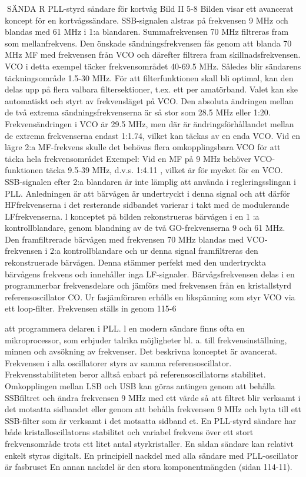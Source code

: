 SÄNDA R
PLL-styrd sändare för kortvåg
Bild II 5-8
Bilden visar ett avancerat koncept för en
kortvågssändare. SSB-signalen alstras på
frekvensen 9 MHz och blandas med 61 MHz
i 1:a blandaren.
Summafrekvensen 70 MHz filtreras fram
som mellanfrekvens. Den önskade sändningsfrekvensen fås genom att blanda 70
MHz MF med frekvensen från VCO och
därefter filtrera fram skillnadsfrekvensen.
VCO i detta exempel täcker frekvensområdet 40-69.5 MHz. Således blir sändarens
täckningsområde 1.5-30 MHz. För att filterfunktionen skall bli optimal, kan den delas
upp på flera valbara filtersektioner, t.ex. ett
per amatörband. Valet kan ske automatiskt
och styrt av frekvensläget på VCO.
Den absoluta ändringen mellan de två
extrema sändningsfrekvenserna är så stor
som 28.5 MHz eller 1:20. Frekvensändringen
i VCO är 29.5 MHz, men där är ändringsförhållandet mellan de extrema frekvenserna
endast 1:1.74, vilket kan täckas av en enda
VCO. Vid en lägre 2:a MF-frekvens skulle
det behövas flera omkopplingsbara VCO för
att täcka hela frekvensområdet
Exempel: Vid en MF på 9 MHz behöver
VCO-funktionen täcka 9.5-39 MHz, d.v.s.
1:4.11 , vilket är för mycket för en VCO.
SSB-signalen efter 2:a blandaren är inte
lämplig att använda i regleringsslingan i
PLL. Anledningen är att bärvågen är undertryckt i denna signal och att därför HFfrekvenserna i det resterande sidbandet
varierar i takt med de modulerande LFfrekvenserna.
l konceptet på bilden rekonstrueras bärvågen i en 1 :a kontrollblandare, genom
blandning av de två GO-frekvenserna 9 och
61 MHz. Den framfiltrerade bärvågen med
frekvensen 70 MHz blandas med VCO-frekvensen i 2:a kontrollblandare och ur denna
signal framfiltreras den rekonstruerade
bärvågen. Denna stämmer perfekt med den
undertryckta bärvågens frekvens och innehåller inga LF-signaler. Bärvågsfrekvensen
delas i en programmerbar frekvensdelare
och jämförs med frekvensen från en kristallstyrd referensoscillator CO. Ur fasjämföraren erhålls en likspänning som styr VCO via
ett loop-filter. Frekvensen ställs in genom
115-6

att programmera delaren i PLL.
l en modern sändare finns ofta en mikroprocessor, som erbjuder talrika möjligheter
bl. a. till frekvensinställning, minnen och avsökning av frekvenser.
Det beskrivna konceptet är avancerat.
Frekvensen i alla oscillatorer styrs av samma referensoscillator. Frekvensstabiliteten
beror alltså enbart på referensoscillatorns
stabilitet.
Omkopplingen mellan LSB och USB kan
göras antingen genom att behålla SSBfiltret och ändra frekvensen 9 MHz med ett
värde så att filtret blir verksamt i det motsatta sidbandet eller genom att behålla frekvensen 9 MHz och byta till ett SSB-filter som
är verksamt i det motsatta sidband et.
En PLL-styrd sändare har både kristalloscillatorns stabilitet och variabel frekvens
över ett stort frekvensområde trots ett litet
antal styrkristaller. En sådan sändare kan
relativt enkelt styras digitalt.
En principiell nackdel med alla sändare
med PLL-oscillator är fasbruset En annan
nackdel är den stora komponentmängden
(sidan 114-11).

